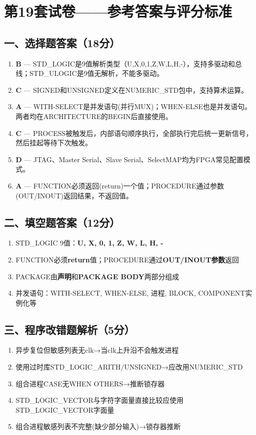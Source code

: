 \chapter{第19套试卷——参考答案与评分标准}

\section{一、选择题答案（18分）}

\begin{enumerate}[label=\arabic*.]
\item \textbf{B} — STD\_LOGIC是9值解析类型（U,X,0,1,Z,W,L,H,-），支持多驱动和总线；STD\_ULOGIC是9值无解析，不能多驱动。
\item \textbf{C} — SIGNED和UNSIGNED定义在NUMERIC\_STD包中，支持算术运算。
\item \textbf{A} — WITH-SELECT是并发语句(并行MUX)；WHEN-ELSE也是并发语句。两者均在ARCHITECTURE的BEGIN后直接使用。
\item \textbf{C} — PROCESS被触发后，内部语句顺序执行，全部执行完后统一更新信号，然后挂起等待下次触发。
\item \textbf{D} — JTAG、Master Serial、Slave Serial、SelectMAP均为FPGA常见配置模式。
\item \textbf{A} — FUNCTION必须返回(return)一个值；PROCEDURE通过参数(OUT/INOUT)返回结果，不返回值。
\end{enumerate}

\section{二、填空题答案（12分）}

\begin{enumerate}[label=\arabic*.]
\item STD\_LOGIC 9值：\textbf{U, X, 0, 1, Z, W, L, H, -}
\item FUNCTION必须\textbf{return}值；PROCEDURE通过\textbf{OUT/INOUT参数}返回
\item PACKAGE由\textbf{声明}和\textbf{PACKAGE BODY}两部分组成
\item 并发语句：WITH-SELECT, WHEN-ELSE, 进程, BLOCK, COMPONENT实例化等
\end{enumerate}

\section{三、程序改错题解析（5分）}

\begin{enumerate}[label=错误\arabic*：]
\item 异步复位但敏感列表无clk→当clk上升沿不会触发进程
\item 使用过时库STD\_LOGIC\_ARITH/UNSIGNED→应改用NUMERIC\_STD
\item 组合进程CASE无WHEN OTHERS→推断锁存器
\item STD\_LOGIC\_VECTOR与字符字面量直接比较应使用STD\_LOGIC\_VECTOR字面量
\item 组合进程敏感列表不完整(缺少部分输入)→锁存器推断
\end{enumerate}

